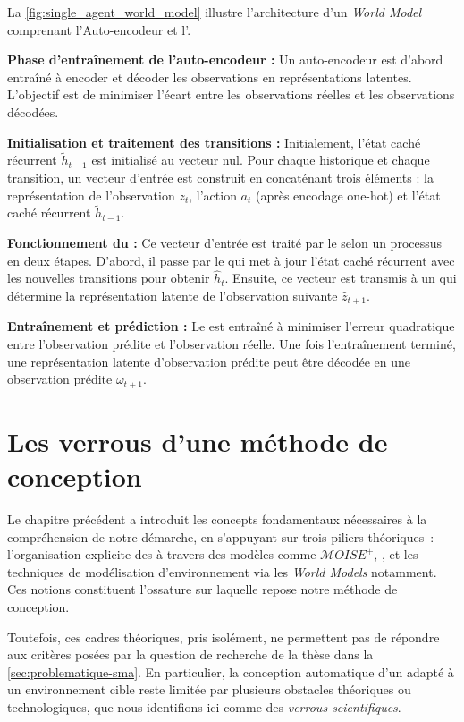 La \autoref{fig:single_agent_world_model} illustre l'architecture d'un \textit{World Model} comprenant l'Auto-encodeur et l'.

\textbf{Phase d'entraînement de l'auto-encodeur :} Un auto-encodeur est d'abord entraîné à encoder et décoder les observations en représentations latentes. L'objectif est de minimiser l'écart entre les observations réelles et les observations décodées.

\textbf{Initialisation et traitement des transitions :} Initialement, l'état caché récurrent $\tilde{h}_{t-1}$ est initialisé au vecteur nul. Pour chaque historique et chaque transition, un vecteur d'entrée est construit en concaténant trois éléments : la représentation de l'observation $z_t$, l'action $a_t$ (après encodage one-hot) et l'état caché récurrent $\tilde{h}_{t-1}$.

\textbf{Fonctionnement du  :} Ce vecteur d'entrée est traité par le  selon un processus en deux étapes. D'abord, il passe par le  qui met à jour l'état caché récurrent avec les nouvelles transitions pour obtenir $\hat{h}_t$. Ensuite, ce vecteur est transmis à un  qui détermine la représentation latente de l'observation suivante $\hat{z}_{t+1}$.

\textbf{Entraînement et prédiction :} Le  est entraîné à minimiser l'erreur quadratique entre l'observation prédite et l'observation réelle. Une fois l'entraînement terminé, une représentation latente d'observation prédite peut être décodée en une observation prédite $\omega_{t+1}$.

\clearpage
\thispagestyle{empty}
\null
\newpage

\chapter{Les verrous d'une méthode de conception}
\label{chap:verrous}

\noindent
Le chapitre précédent a introduit les concepts fondamentaux nécessaires à la compréhension de notre démarche, en s'appuyant sur trois piliers théoriques~: l'organisation explicite des  à travers des modèles comme \textit{$\mathcal{M}OISE^+$}, , et les techniques de modélisation d'environnement via les \textit{World Models} notamment. Ces notions constituent l'ossature sur laquelle repose notre méthode de conception.

Toutefois, ces cadres théoriques, pris isolément, ne permettent pas de répondre aux critères posées par la question de recherche de la thèse dans la \autoref{sec:problematique-sma}. En particulier, la conception automatique d'un  adapté à un environnement cible reste limitée par plusieurs obstacles théoriques ou technologiques, que nous identifions ici comme des \textit{verrous scientifiques}.

